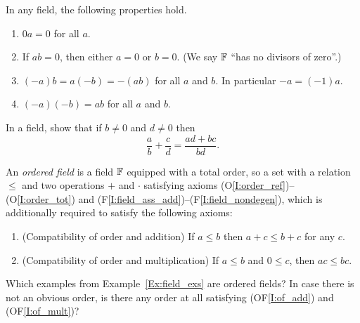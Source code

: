 \documentclass{book}
\begin{document}
\begin{prop}
In any field, the following properties hold.
\begin{enumerate}
\item $0 a = 0$ for all $a$. 
\item If $ab = 0$, then either $a = 0$ or $b = 0$. (We say $\mathbb{F}$ ``has no divisors of zero''.)
\label{I:field_props_II_zerodivs}
\item $(-a)b = a(-b) = - (ab)$ for all $a$ and $b$. In particular $-a = (-1)a$. 
\item $(-a)(-b) = ab$ for all $a$ and $b$.
\end{enumerate}
\label{P:field_props_II}
\end{prop}

\begin{prob}
In a field, show that if $b \neq 0$ and $d \neq 0$ then
\[
	\frac a b + \frac c d = \frac{ad + bc}{bd}.
\]
\label{Pr:add_fractions}
\end{prob}

\begin{defn}
An {\em ordered field} is a field $\mathbb{F}$ equipped with a total order, so a set
with a relation $\leq$ and two operations $+$ and $\cdot$ 
satisfying axioms (O\ref{I:order_ref})--(O\ref{I:order_tot}) and
(F\ref{I:field_ass_add})--(F\ref{I:field_nondegen}), which is additionally
required to satisfy the following axioms:
\begin{enumerate}
\item (Compatibility of order and addition) If $a \leq b$ then $a + c \leq b + c$ for any $c$.
\label{I:of_add}
\item (Compatibility of order and multiplication) If $a \leq b$ and $0 \leq c$, then $ac \leq bc$.
\label{I:of_mult}
\end{enumerate}
\label{D:ordered_field}
\end{defn}

\begin{ex}
Which examples from Example~\ref{Ex:field_exs} are ordered fields? In case
there is not an obvious order, is there any order at all satisfying (OF\ref{I:of_add}) and (OF\ref{I:of_mult})?
\label{Ex:of_exs}
\end{ex}
\end{document}
